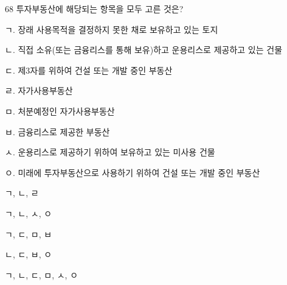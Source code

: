 \begin{question}{68}
투자부동산에 해당되는 항목을 모두 고른 것은?
\begin{framedtext}
ㄱ. 장래 사용목적을 결정하지 못한 채로 보유하고 있는 토지 \par
ㄴ. 직접 소유(또는 금융리스를 통해 보유)하고 운용리스로 제공하고 있는 건물 \par
ㄷ. 제3자를 위하여 건설 또는 개발 중인 부동산 \par
ㄹ. 자가사용부동산 \par
ㅁ. 처분예정인 자가사용부동산 \par
ㅂ. 금융리스로 제공한 부동산 \par
ㅅ. 운용리스로 제공하기 위하여 보유하고 있는 미사용 건물 \par
ㅇ. 미래에 투자부동산으로 사용하기 위하여 건설 또는 개발 중인 부동산
\end{framedtext}
\begin{choices}
  \item ㄱ, ㄴ, ㄹ
  \item ㄱ, ㄴ, ㅅ, ㅇ
  \item ㄱ, ㄷ, ㅁ, ㅂ
  \item ㄴ, ㄷ, ㅂ, ㅇ
  \item ㄱ, ㄴ, ㄷ, ㅁ, ㅅ, ㅇ
\end{choices}
\end{question}
